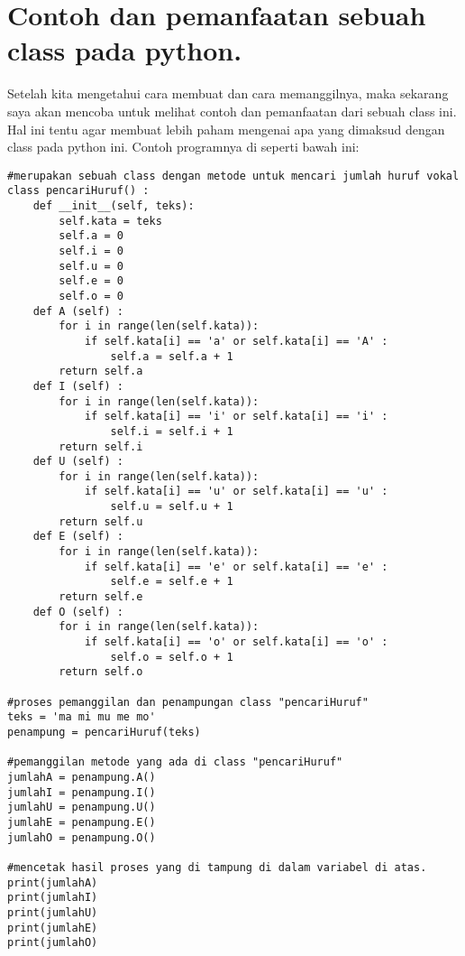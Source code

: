 \section{Contoh dan pemanfaatan sebuah class pada python.}
Setelah kita mengetahui cara membuat dan cara memanggilnya, maka sekarang saya akan mencoba untuk melihat contoh dan pemanfaatan dari sebuah class ini. Hal ini tentu agar membuat lebih paham mengenai apa yang dimaksud dengan class pada python ini. Contoh programnya di seperti bawah ini:
\begin{lstlisting}
#merupakan sebuah class dengan metode untuk mencari jumlah huruf vokal
class pencariHuruf() :
    def __init__(self, teks):
        self.kata = teks
        self.a = 0
        self.i = 0
        self.u = 0
        self.e = 0
        self.o = 0
    def A (self) :
        for i in range(len(self.kata)):
            if self.kata[i] == 'a' or self.kata[i] == 'A' :
                self.a = self.a + 1
        return self.a
    def I (self) :
        for i in range(len(self.kata)):
            if self.kata[i] == 'i' or self.kata[i] == 'i' :
                self.i = self.i + 1
        return self.i
    def U (self) :
        for i in range(len(self.kata)):
            if self.kata[i] == 'u' or self.kata[i] == 'u' :
                self.u = self.u + 1
        return self.u
    def E (self) :
        for i in range(len(self.kata)):
            if self.kata[i] == 'e' or self.kata[i] == 'e' :
                self.e = self.e + 1
        return self.e
    def O (self) :
        for i in range(len(self.kata)):
            if self.kata[i] == 'o' or self.kata[i] == 'o' :
                self.o = self.o + 1
        return self.o

#proses pemanggilan dan penampungan class "pencariHuruf"
teks = 'ma mi mu me mo'
penampung = pencariHuruf(teks)

#pemanggilan metode yang ada di class "pencariHuruf"
jumlahA = penampung.A()
jumlahI = penampung.I()
jumlahU = penampung.U()
jumlahE = penampung.E()
jumlahO = penampung.O()

#mencetak hasil proses yang di tampung di dalam variabel di atas.
print(jumlahA)
print(jumlahI)
print(jumlahU)
print(jumlahE)
print(jumlahO)
\end{lstlisting}
